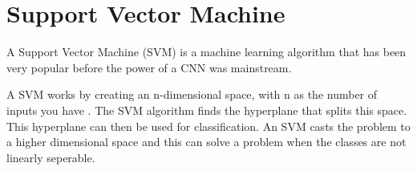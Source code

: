 \section{Support Vector Machine}
A Support Vector Machine (SVM) is a machine learning algorithm that has been
very popular before the power of a CNN was mainstream.

A SVM works by creating an n-dimensional space, with n as the number of
inputs you have \textcite{svm}. The SVM algorithm finds the hyperplane that splits this space.
This hyperplane can then be used for classification. 
An SVM casts the problem to a higher dimensional space and this can solve a problem when the classes are not linearly seperable.